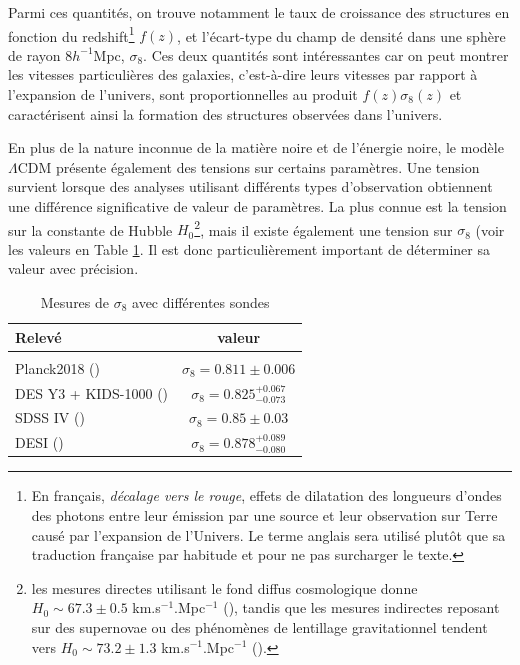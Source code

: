 \documentclass{book}
\begin{document}
Parmi ces quantités, on trouve notamment le taux de croissance des structures en fonction du redshift\footnote{En français, \textit{décalage vers le rouge}, effets de dilatation des longueurs d'ondes des photons entre leur émission par une source et leur observation sur Terre causé par l'expansion de l'Univers. Le terme anglais sera utilisé plutôt que sa traduction française par habitude et pour ne pas surcharger le texte.} $f(z)$, et l'écart-type du champ de densité dans une sphère de rayon 8$h^{-1}$Mpc, $\sigma_8$. Ces deux quantités sont intéressantes car on peut montrer les vitesses particulières des galaxies, c'est-à-dire leurs vitesses par rapport à l'expansion de l'univers, sont proportionnelles au produit $f(z)\sigma_8(z)$ et caractérisent ainsi la formation des structures observées dans l'univers.

En plus de la nature inconnue de la matière noire et de l'énergie noire, le modèle $\Lambda$CDM présente également des tensions sur certains paramètres. Une tension survient lorsque des analyses utilisant différents types d'observation obtiennent une différence significative de valeur de paramètres. La plus connue est la tension sur la constante de Hubble $H_0$\footnote{les mesures directes utilisant le fond diffus cosmologique donne $H_0 \sim 67.3 \pm 0.5$ km.s$^{-1}$.Mpc$^{-1}$ (\cite{planck_collaboration_planck_2020}), tandis que les mesures indirectes reposant sur des supernovae ou des phénomènes de lentillage gravitationnel tendent vers $H_0 \sim 73.2 \pm 1.3$ km.s$^{-1}$.Mpc$^{-1}$ (\cite{riess_comprehensive_2022}).}, mais il existe également une tension sur $\sigma_8$ (voir les valeurs en Table \ref{tab:fs8}. Il est donc particulièrement important de déterminer sa valeur avec précision.

\begin{table}
	\begin{tabular}{l|c}
		Relevé & valeur\\
		\hline\\
		Planck2018 (\cite{planck_collaboration_planck_2020}) & $\sigma_8 = 0.811\pm 0.006$\\
		DES Y3 + KIDS-1000 (\cite{dark_energy_survey_y3_2023}) & $\sigma_8 = 0.825^{+0.067}_{-0.073}$\\
		SDSS IV  (\cite{eboss_collaboration_completed_2021}) & $\sigma_8 = 0.85 \pm 0.03$\\
		DESI (\cite{chen_not_2024}) & $\sigma_8 = 0.878^{+0.089}_{-0.080}$
	\end{tabular}
	\caption{Mesures de $\sigma_8$ avec différentes sondes}
	\label{tab:fs8}
\end{table}
\end{document}
